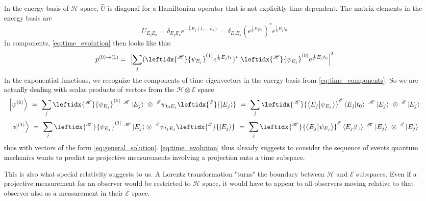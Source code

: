\documentclass[12pt]{article}
\begin{document}
In the energy basis of $\mathscr{H}$ space, $\hat{U}$ is diagonal for a Hamiltonian operator that is not explicitly time-dependent. The matrix elements in the energy basis are
\begin{equation} 
U_{E_j E_k} = \delta_{E_j E_k} e^{-\frac{\mathrm{i}}{\hbar}E_j(t_1-t_0)}
= 
\delta_{E_j E_k}(e^{\frac{\mathrm{i}}{\hbar}E_j t_1})^* e^{\frac{\mathrm{i}}{\hbar}E_j t_0}
\end{equation}
In components, \eqref{eq:time_evolution} then looks like this:
\begin{equation} 
p^{(0)\rightarrow(1)} =\ 
\Bigl| \sum_j
(\leftidx{^\mathscr{H}}{\psi_{E_j}}^{(1)} e^{\frac{\mathrm{i}}{\hbar}E_j t_1})^*\ 
\leftidx{^\mathscr{H}}{\psi_{E_j}}^{(0)} e^{\frac{\mathrm{i}}{\hbar}E_j t_0}
\Bigr|^2
\end{equation}
In the exponential functions, we recognize the components of time eigenvectors in the energy basis from \eqref{eq:time_components}.
So we are actually dealing with scalar products of vectors from the $\mathscr{H}\otimes\mathscr{E}$ space
\begin{equation*}
\ket{\psi^{(0)}}\ =\ \sum_j \leftidx{^\mathscr{H}}{\psi_{E_j}}^{(0)}\ ^\mathscr{H}\ket{E_j} 
\ \otimes\ ^\mathscr{E}\psi_{t_0 E_j} \leftidx{^\mathscr{E}}{\ket{E_j}}
\ =\ \sum_j \leftidx{^\mathscr{H}}{\bra{E_j}\ket{\psi_{E_j}}} ^\mathscr{E}\bra{E_j}\ket{t_0} \ ^\mathscr{H}\ket{E_j}\ \otimes\ ^\mathscr{E}\ket{E_j}
\end{equation*}
\begin{equation*}
\ket{\psi^{(1)}}\ =\ \sum_j \leftidx{^\mathscr{H}}{\psi_{E_j}}^{(1)}\ ^\mathscr{H}\ket{E_j} 
\otimes\ ^\mathscr{E}\psi_{t_1 E_j} \leftidx{^\mathscr{E}}{\ket{E_j}}
\ =\ \sum_j \leftidx{^\mathscr{H}}{\bra{E_j}\ket{\psi_{E_j}}} ^\mathscr{E}\bra{E_j}\ket{t_1} \ ^\mathscr{H}\ket{E_j}\ \otimes\ ^\mathscr{E}\ket{E_j} 
\end{equation*}
thus with vectors of the form \eqref{eq:general_solution}. \eqref{eq:time_evolution} thus already suggests to consider the sequence of events quantum mechanics wants to predict as projective measurements involving a projection onto a time subspace.

This is also what special relativity suggests to us. A Lorentz transformation "turns" the boundary between $\mathscr{H}$ and $\mathscr{E}$ subspaces. Even if a projective measurement for an observer would be restricted to $\mathscr{H}$ space, it would have to appear to all observers moving relative to that observer also as a measurement in their $\mathscr{E}$ space.
\end{document}
